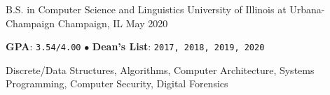 

\begin{cventries}

  \cventry
    {B.S. in Computer Science and Linguistics} %
    {University of Illinois at Urbana-Champaign} %
    {Champaign, IL} %
    {May 2020} %
    {
      \begin{cvitems} %
        \item {\textbf{GPA}: \texttt{3.54/4.00} \qquad $\bullet$ \textbf{Dean's List}: \texttt{2017, 2018, 2019, 2020}}
        \item {Discrete/Data Structures, Algorithms, Computer Architecture, Systems Programming, Computer Security, Digital Forensics}%
      \end{cvitems}
    }

\end{cventries}
